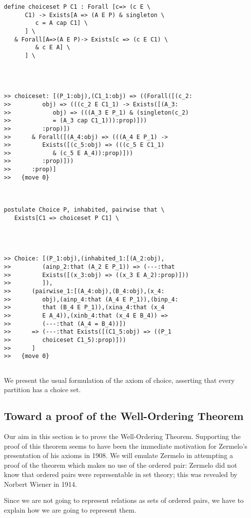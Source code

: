 \documentclass{article}
\begin{document}
\begin{verbatim}
define choiceset P C1 : Forall [c=> (c E \
      C1) -> Exists[A => (A E P) & singleton \
         c = A cap C1] \
      ] \
   & Forall[A=>(A E P)-> Exists[c => (c E C1) \
         & c E A] \
      ] \
   



>> choiceset: [(P_1:obj),(C1_1:obj) => ((Forall([(c_2:
>>         obj) => (((c_2 E C1_1) -> Exists([(A_3:
>>            obj) => (((A_3 E P_1) & (singleton(c_2)
>>            = (A_3 cap C1_1))):prop)]))
>>         :prop)])
>>      & Forall([(A_4:obj) => (((A_4 E P_1) ->
>>         Exists([(c_5:obj) => (((c_5 E C1_1)
>>            & (c_5 E A_4)):prop)]))
>>         :prop)]))
>>      :prop)]
>>   {move 0}



postulate Choice P, inhabited, pairwise that \
   Exists[C1 => choiceset P C1] \
   



>> Choice: [(P_1:obj),(inhabited_1:[(A_2:obj),
>>         (ainp_2:that (A_2 E P_1)) => (---:that
>>         Exists([(x_3:obj) => ((x_3 E A_2):prop)]))
>>         ]),
>>      (pairwise_1:[(A_4:obj),(B_4:obj),(x_4:
>>         obj),(ainp_4:that (A_4 E P_1)),(binp_4:
>>         that (B_4 E P_1)),(xina_4:that (x_4
>>         E A_4)),(xinb_4:that (x_4 E B_4)) =>
>>         (---:that (A_4 = B_4))])
>>      => (---:that Exists([(C1_5:obj) => ((P_1
>>         choiceset C1_5):prop)]))
>>      ]
>>   {move 0}


\end{verbatim}

We present the usual formulation of the axiom of choice, asserting that every partition has a choice set.

\subsection{Toward a proof of the Well-Ordering Theorem}

Our aim in this section is to prove the Well-Ordering Theorem.  Supporting the proof of this theorem seems to have been the immediate motivation for Zermelo's presentation of his axioms in 1908.  We will emulate Zermelo in attempting a proof of the theorem which makes no use of the ordered pair:  Zermelo did not know that ordered pairs were representable in set theory;  this was revealed by Norbert Wiener in 1914.

Since we are not going to represent relations as sets of ordered pairs, we have to explain how we are going to represent them.
\end{document}
